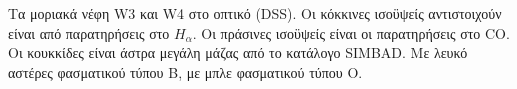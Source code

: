 Τα μοριακά νέφη W3 και W4 στο οπτικό (DSS). Οι κόκκινες ισοϋψείς αντιστοιχούν είναι από παρατηρήσεις στο $H_{\alpha}$. Οι πράσινες ισοϋψείς είναι οι παρατηρήσεις στο CO. Οι κουκκίδες είναι άστρα μεγάλη μάζας από το κατάλογο SIMBAD. Με λευκό αστέρες φασματικού τύπου B, με μπλε φασματικού τύπου O.